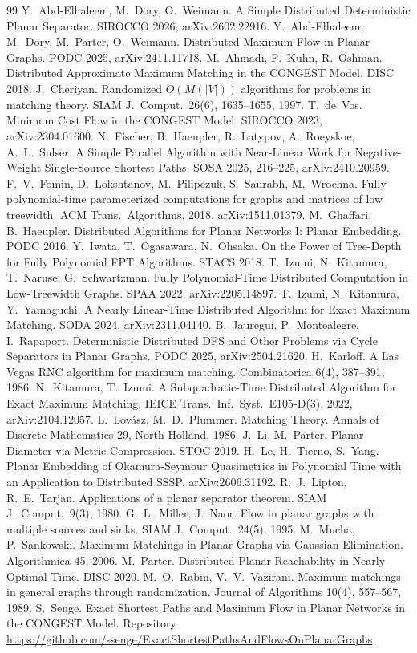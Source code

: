 \documentclass[11pt]{article}
\theoremstyle{definition}
\theoremstyle{remark}
\theoremstyle{plain}
\begin{document}
\begin{thebibliography}{99}
 Y.~Abd-Elhaleem, M.~Dory, O.~Weimann. A Simple Distributed Deterministic Planar Separator. SIROCCO 2026, arXiv:2602.22916.
 Y.~Abd-Elhaleem, M.~Dory, M.~Parter, O.~Weimann. Distributed Maximum Flow in Planar Graphs. PODC 2025, arXiv:2411.11718.
 M.~Ahmadi, F.~Kuhn, R.~Oshman. Distributed Approximate Maximum Matching in the CONGEST Model. DISC 2018.
 J.~Cheriyan. Randomized $\tilde O(M(|V|))$ algorithms for problems in matching theory. SIAM J.\ Comput.\ 26(6), 1635--1655, 1997.
 T.~de~Vos. Minimum Cost Flow in the CONGEST Model. SIROCCO 2023, arXiv:2304.01600.
 N.~Fischer, B.~Haeupler, R.~Latypov, A.~Roeyskoe, A.~L.~Sulser. A Simple Parallel Algorithm with Near-Linear Work for Negative-Weight Single-Source Shortest Paths. SOSA 2025, 216--225, arXiv:2410.20959.
 F.~V.~Fomin, D.~Lokshtanov, M.~Pilipczuk, S.~Saurabh, M.~Wrochna. Fully polynomial-time parameterized computations for graphs and matrices of low treewidth. ACM Trans.\ Algorithms, 2018, arXiv:1511.01379.
 M.~Ghaffari, B.~Haeupler. Distributed Algorithms for Planar Networks I: Planar Embedding. PODC 2016.
 Y.~Iwata, T.~Ogasawara, N.~Ohsaka. On the Power of Tree-Depth for Fully Polynomial FPT Algorithms. STACS 2018.
 T.~Izumi, N.~Kitamura, T.~Naruse, G.~Schwartzman. Fully Polynomial-Time Distributed Computation in Low-Treewidth Graphs. SPAA 2022, arXiv:2205.14897.
 T.~Izumi, N.~Kitamura, Y.~Yamaguchi. A Nearly Linear-Time Distributed Algorithm for Exact Maximum Matching. SODA 2024, arXiv:2311.04140.
 B.~Jauregui, P.~Montealegre, I.~Rapaport. Deterministic Distributed DFS and Other Problems via Cycle Separators in Planar Graphs. PODC 2025, arXiv:2504.21620.
 H.~Karloff. A Las Vegas RNC algorithm for maximum matching. Combinatorica 6(4), 387--391, 1986.
 N.~Kitamura, T.~Izumi. A Subquadratic-Time Distributed Algorithm for Exact Maximum Matching. IEICE Trans.\ Inf.\ Syst.\ E105-D(3), 2022, arXiv:2104.12057.
 L.~Lov\'asz, M.~D.~Plummer. Matching Theory. Annals of Discrete Mathematics 29, North-Holland, 1986.
 J.~Li, M.~Parter. Planar Diameter via Metric Compression. STOC 2019.
 H.~Le, H.~Tierno, S.~Yang. Planar Embedding of Okamura-Seymour Quasimetrics in Polynomial Time with an Application to Distributed SSSP. arXiv:2606.31192.
 R.~J.~Lipton, R.~E.~Tarjan. Applications of a planar separator theorem. SIAM J.\ Comput.\ 9(3), 1980.
 G.~L.~Miller, J.~Naor. Flow in planar graphs with multiple sources and sinks. SIAM J.\ Comput.\ 24(5), 1995.
 M.~Mucha, P.~Sankowski. Maximum Matchings in Planar Graphs via Gaussian Elimination. Algorithmica 45, 2006.
 M.~Parter. Distributed Planar Reachability in Nearly Optimal Time. DISC 2020.
 M.~O.~Rabin, V.~V.~Vazirani. Maximum matchings in general graphs through randomization. Journal of Algorithms 10(4), 557--567, 1989.
 S.~Senge. Exact Shortest Paths and Maximum Flow in Planar Networks in the CONGEST Model. Repository \url{https://github.com/ssenge/ExactShortestPathsAndFlowsOnPlanarGraphs}.
\end{thebibliography}
\end{document}
